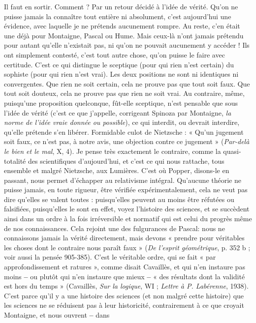 Il faut en sortir. Comment ? Par un retour décidé à l’idée de vérité. Qu’on
ne puisse jamais la connaître tout entière ni absolument, c’est aujourd’hui une
évidence, avec laquelle je ne prétends aucunement rompre. Au reste, c’en était
une déjà pour Montaigne, Pascal ou Hume. Mais ceux-là n’ont jamais prétendu
pour autant qu’elle n’existait pas, ni qu’on ne pouvait aucunement y
accéder ! Ils ont simplement contesté, c’est tout autre chose, qu’on puisse le
faire avec certitude. C’est ce qui distingue le sceptique (pour qui rien n’est certain)
du sophiste (pour qui rien n’est vrai). Les deux positions ne sont ni identiques
ni convergentes. Que rien ne soit certain, cela ne prouve pas que tout
soit faux. Que tout soit douteux, cela ne prouve pas que rien ne soit vrai. Au
contraire, même, puisqu’une proposition quelconque, fût-elle sceptique, n’est
pensable que sous l’idée de vérité (c’est ce que j'appelle, corrigeant Spinoza par
Montaigne, {\it la norme de l'idée vraie donnée ou possible}), ce qui interdit, ou
devrait interdire, qu’elle prétende s’en libérer. Formidable culot de Nietzsche :
« Qu'un jugement soit faux, ce n’est pas, à notre avis, une objection contre ce
jugement » ({\it Par-delà le bien et le mal}, X, 4). Je pense très exactement le
contraire, comme la quasi-totalité des scientifiques d’aujourd’hui, et c’est ce
qui nous rattache, tous ensemble et malgré Nietzsche, aux Lumières. C’est où
Popper, disons-le en passant, nous permet d'échapper au relativisme intégral.
Qu’aucune théorie ne puisse jamais, en toute rigueur, être vérifiée expérimentalement,
cela ne veut pas dire qu’elles se valent toutes : puisqu'elles peuvent au
moins être réfutées ou falsifiées, puisqu'elles le sont en effet, voyez l’histoire des
sciences, et se succèdent ainsi dans un ordre à la fois irréversible et normatif qui
est celui du progrès même de nos connaissances. Cela rejoint une des fulgurances
de Pascal: nous ne connaissons jamais la vérité directement, mais
devons « prendre pour véritables les choses dont le contraire nous paraît faux »
({\it De l'esprit géométrique}, p. 352 b ; voir aussi la pensée 905-385). C’est le véritable
ordre, qui se fait « par approfondissement et ratures », comme disait
Cavaillès, et qui n’en instaure pas moins {\bf --} ou plutôt qui n’en instaure que
mieux {\bf --} « des résultats dont la validité est hors du temps » (Cavaillès, {\it Sur la
logique}, WI ; {\it Lettre à P. Labérenne}, 1938). C’est parce qu’il y a une histoire des
sciences (et non malgré cette histoire) que les sciences ne se réduisent pas à leur
historicité, contrairement à ce que croyait Montaigne, et nous ouvrent {\bf --} dans
